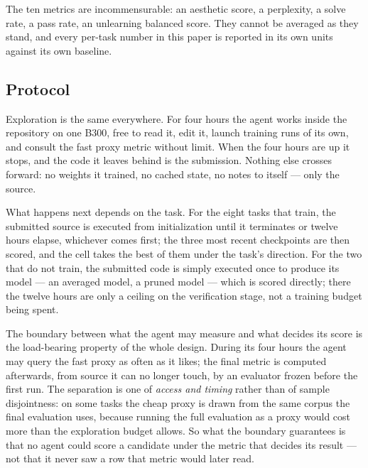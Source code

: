 The ten metrics are incommensurable: an aesthetic score, a perplexity, a solve rate, a pass rate, an
unlearning balanced score. They cannot be averaged as they stand, and every per-task number in this
paper is reported in its own units against its own baseline.

\subsection{Protocol}
\label{sec:protocol}

Exploration is the same everywhere. For four hours the agent works inside the repository on one B300,
free to read it, edit it, launch training runs of its own, and consult the fast proxy metric without
limit. When the four hours are up it stops, and the code it leaves behind is the submission. Nothing
else crosses forward: no weights it trained, no cached state, no notes to itself --- only the source.

What happens next depends on the task. For the eight tasks that train, the submitted source is executed from
initialization until it terminates or twelve hours elapse, whichever comes first; the three most recent
checkpoints are then scored, and the cell takes the best of them under the task's direction. For the
two that do not train, the submitted code is simply executed once to produce its model --- an
averaged model, a pruned model --- which is scored directly; there the twelve hours are only a ceiling
on the verification stage, not a training budget being spent.

The boundary between what the agent may measure and what decides its score is the load-bearing
property of the whole design. During its four hours the agent may query the fast proxy as often as it
likes; the final metric is computed afterwards, from source it can no longer touch, by an evaluator
frozen before the first run. The separation is one of \emph{access and timing} rather than of sample
disjointness: on some tasks the cheap proxy is drawn from the same corpus the final evaluation uses,
because running the full evaluation as a proxy would cost more than the exploration budget allows. So
what the boundary guarantees is that no agent could score a candidate under the metric that decides
its result --- not that it never saw a row that metric would later read.

